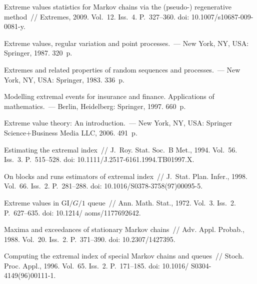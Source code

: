\begin{multicols}{2}
\vspace*{-9pt}

{\small\frenchspacing
 {%
 \begin{thebibliography}{99}
 
 \vspace*{-4pt}

Extreme values statistics for Markov chains via the
(pseudo-) regenerative method~// Extremes, 2009.  Vol.~12. Iss.~4. P.~327--360.   
doi: 10.1007/s10687-009-0081-y.

  Extreme values, regular variation and point 
processes.~--- New York, NY, USA: Springer,  1987. 320~p.

  Extremes 
and related properties of random sequences
and processes.~--- New York, NY, USA: Springer,  1983. 336~p.

 Modelling extremal events for 
insurance and finance. Applications of mathematics.~--- Berlin, Heidelberg:   
Springer, 1997. 660~p.

  Extreme value theory:  An introduction.~---   New 
York, NY, USA:  Springer Science\;+\;Business Media LLC, 2006. 491~p.




Estimating the extremal index~//
J.~Roy. Stat. Soc.~B Met., 1994.  Vol.~56. Iss.~3. P.~515--528.
doi: 10.1111/J.2517-6161.1994.TB01997.X.

On blocks and runs estimators of extremal index~// J.~Stat. Plan. Infer.,
1998. Vol.~66. Iss.~2. P.~281--288.
doi: 10.1016/S0378-3758(97)00095-5.




  Extreme values in $\mathrm{GI}/G/1$ queue~// Ann. 
Math. Stat., 1972. Vol.~3. Iss.~2. P.~627--635. doi: 10.1214/ aoms/1177692642.


 Maxima and exceedances of stationary Markov 
chains~// Adv. Appl. Probab., 1988. Vol.~20. Iss.~2. P.~371--390. 
doi: 10.2307/1427395.


 Computing the extremal index of special
Markov chains and queues~// Stoch. Proc. Appl., 1996. 
Vol.~65. Iss.~2. P.~171--185. doi: 10.1016/ S0304-4149(96)00111-1.


\end{thebibliography}}}
\end{multicols}
